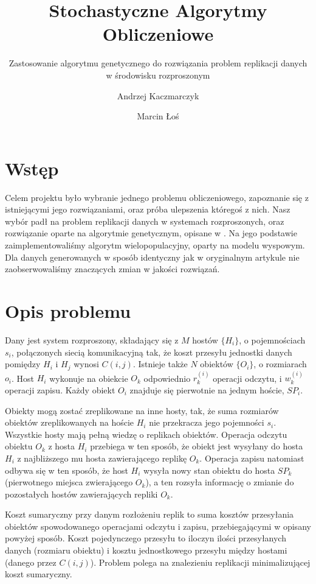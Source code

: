 \documentclass[11pt,pdftex,a4paper]{scrartcl}
\title{Stochastyczne Algorytmy Obliczeniowe}
\subtitle{ 
  Zastosowanie algorytmu genetycznego do rozwiązania problem replikacji danych
  w środowisku rozproszonym
}
\date{}
\author{
  Andrzej Kaczmarczyk
  \and
  Marcin Łoś
}
\begin{document}
\maketitle

\section{Wstęp}
Celem projektu było wybranie jednego problemu obliczeniowego, zapoznanie się z istniejącymi jego
rozwiązaniami, oraz próba ulepszenia któregoś z nich. Nasz wybór padł na problem replikacji danych
w systemach rozproszonych, oraz rozwiązanie oparte na algorytmie genetycznym, opisane w \cite{Ahmad}.
Na jego podstawie zaimplementowaliśmy algorytm wielopopulacyjny, oparty na modelu wyspowym. Dla danych
generowanych w sposób identyczny jak w oryginalnym artykule nie zaobserwowaliśmy znaczących zmian w 
jakości rozwiązań.

\section{Opis problemu}
Dany jest system rozproszony, składający się z \(M\) hostów \(\{H_i\}\), o pojemnościach \(s_i\), 
połączonych siecią komunikacyjną tak, że koszt przesyłu jednostki danych pomiędzy \(H_i\) i \(H_j\)
wynosi \(C(i,j)\). Istnieje także \(N\) obiektów \(\{O_i\}\), o rozmiarach \(o_i\). Host \(H_i\)
wykonuje na obiekcie \(O_k\) odpowiednio \(r^{(i)}_k\) operacji odczytu, i \(w^{(i)}_k\) operacji
zapisu. Każdy obiekt \(O_i\) znajduje się pierwotnie na jednym hoście, \(SP_i\).

Obiekty mogą zostać zreplikowane na inne hosty, tak, że suma rozmiarów obiektów zreplikowanych
na hoście \(H_i\) nie przekracza jego pojemności \(s_i\). Wszystkie hosty mają pełną wiedzę o 
replikach obiektów. Operacja odczytu obiektu \(O_k\) z hosta \(H_i\) przebiega w ten sposób, że
obiekt jest wysyłany do hosta \(H_i\) z najbliższego mu hosta zawierającego replikę \(O_k\).
Operacja zapisu natomiast odbywa się w ten sposób, że host \(H_i\) wysyła nowy stan obiektu do
hosta \(SP_k\) (pierwotnego miejsca zwierającego \(O_k\)), a ten rozsyła informację o zmianie do
pozostałych hostów zawierających repliki \(O_k\). 

Koszt sumaryczny przy danym rozłożeniu replik to suma kosztów przesyłania obiektów spowodowanego
operacjami odczytu i zapisu, przebiegającymi w opisany powyżej sposób. Koszt pojedynczego przesyłu
to iloczyn ilości przesyłanych danych (rozmiaru obiektu) i kosztu jednostkowego przesyłu między
hostami (danego przez \(C(i,j)\)). Problem polega na znalezieniu replikacji minimalizującej koszt
sumaryczny.
\end{document}
